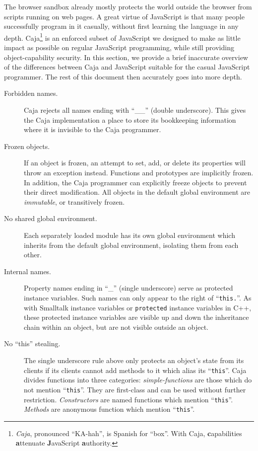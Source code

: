 \documentclass[letterpaper,twocolumn,10pt]{article}
\newcommand{\code}[1]{{\tt {#1}}}              %
\begin{document}
The browser sandbox already mostly protects the world outside the browser 
from scripts running on web pages. A great virtue of JavaScript is that many 
people successfully program in it casually, without first learning the 
language in any depth. Caja\footnote{
%
\emph{Caja}, pronounced ``KA-hah'', is Spanish for ``box''. With Caja, 
\textbf{c}apabilities \textbf{a}ttenuate \textbf{J}avaScript 
\textbf{a}uthority.
%
} is an enforced subset of JavaScript we designed to make as little impact as 
possible on regular JavaScript programming, while still providing 
object-capability security. In this section, we provide a brief inaccurate 
overview of the differences between Caja and JavaScript suitable for the 
casual JavaScript programmer. The rest of this document then accurately goes 
into more depth.

\begin{description}

  \item[Forbidden names.] Caja rejects all names ending with ``\_\_'' (double 
  underscore). This gives the Caja implementation a place to store its 
  bookkeeping information where it is invisible to the Caja programmer.
 
  \item[Frozen objects.] If an object is frozen, an attempt to set, add, or 
  delete its properties will throw an exception instead. Functions and 
  prototypes are implicitly frozen. In addition, the Caja programmer can 
  explicitly freeze objects to prevent their direct modification. All objects 
  in the default global environment are \emph{immutable}, or transitively 
  frozen.
 
  \item[No shared global environment.] Each separately loaded module has its 
  own global environment which inherits from the default global environment, 
  isolating them from each other.

  \item[Internal names.] Property names ending in ``\_'' (single underscore) 
  serve as protected instance variables. Such names can only appear to the 
  right of ``\code{this.}''. As with Smalltalk instance variables or 
  \code{protected} instance variables in C++, these protected instance 
  variables are visible up and down the inheritance chain within an object, 
  but are not visible outside an object.
 
  \item[No ``this'' stealing.] The single underscore rule above only protects 
  an object's state from its clients if its clients cannot add methods to it 
  which alias its ``\code{this}''. Caja divides functions into three 
  categories: \emph{simple-functions} are those which do not mention 
  ``\code{this}''. They are first-class and can be used without further 
  restriction. \emph{Constructors} are named functions which mention 
  ``\code{this}''. \emph{Methods} are anonymous function which mention 
  ``\code{this}''.
  

\end{description}
\end{document}
